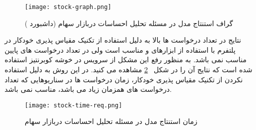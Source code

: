 \begin{figure}[!t]
	\centering
	\texttt{[image: stock-graph.png]}
	\caption{گراف استنتاج مدل در مسئله تحلیل احساسات دربازار سهام (داشبورد )}
	\label{fig: stock graph}
\end{figure}

نتایج در تعداد درخواست ها بالا به دلیل استفاده از تکنیک مقیاس پذیری خودکار در پلتفرم با استفاده از ابزارهای  و  مناسب است ولی در تعداد درخواست های پایین مناسب نمی باشد. به منظور رفع این مشکل از سرویس  در خوشه کوبرنتیز استفاده شده است که نتایج آن را در شکل 
~\ref{fig: stock time request}
مشاهده می کنید. در این روش به دلیل استفاده نکردن از تکنیک مقیاس پذیری خودکار،‌ زمان درخواست ها در سناریوهایی که تعداد درخواست های همزمان زیاد می باشد، مناسب نمی باشد.

\begin{figure}[!t]
	\centering
	\texttt{[image: stock-time-req.png]}
	\caption{زمان استنتاج مدل در مسئله تحلیل احساسات دربازار سهام}
	\label{fig: stock time request}
\end{figure}


